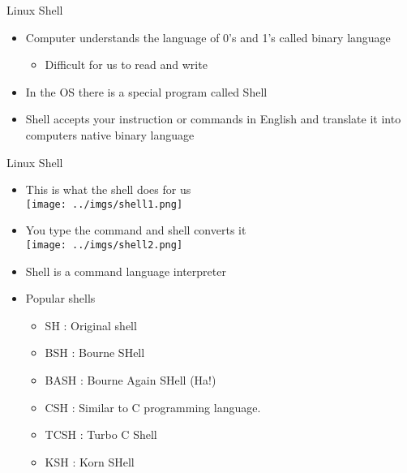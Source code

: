 \documentclass{beamer}
\begin{document}
\begin{frame}{Linux Shell}
\begin{itemize}
\item Computer understands the language of 0's and 1's called binary language
\begin{itemize}
\item Difficult for us to read and write
\end{itemize}
\item In the OS there is a special program called Shell
\item Shell accepts your instruction or commands in English and translate it into computers native binary language
\end{itemize}
\end{frame}

\begin{frame}{Linux Shell}
\begin{itemize}
\item This is what the shell does for us \\
\texttt{[image: ../imgs/shell1.png]}
\item You type the command and shell converts it \\
\texttt{[image: ../imgs/shell2.png]}
\end{itemize}
\end{frame}

\begin{frame}{}
\begin{itemize}
\item Shell is a command language interpreter
\item Popular shells
\begin{itemize}
\item SH : Original shell
\item BSH : Bourne SHell
\item BASH : Bourne Again SHell (Ha!)
\item CSH : Similar to C programming language.
\item TCSH : Turbo C Shell
\item KSH : Korn SHell
\end{itemize}
\end{itemize}
\end{frame}
\end{document}
